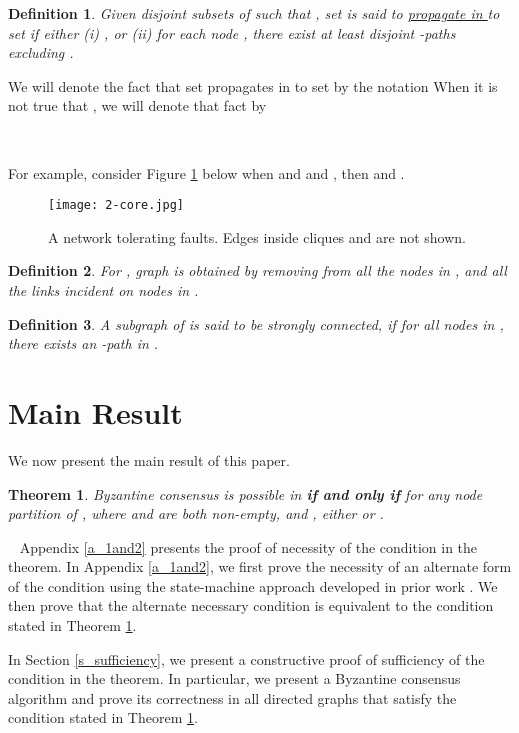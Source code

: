 \documentclass[letterpaper, 11pt]{article}
\newenvironment{proof}{\noindent {\bf Proof:}~}{\hspace*{\fill}}
\newtheorem{theorem}{Theorem}
\newtheorem{definition}{Definition}
\begin{document}
\begin{definition}
\label{def:propagate}
Given disjoint subsets  of  such that ,
set  is said to
\underline{propagate in } to set 
if either (i) , or (ii) for each node , there exist at least
 disjoint -paths excluding .
\end{definition}
We will denote the fact that set  propagates in  to set 
by the notation 
When it is not true that , we will denote that fact by 

~

For example, consider Figure \ref{f:2-core} below when  and  and , then  and .

\begin{figure}[hbtp!]
\centering
\texttt{[image: 2-core.jpg]}
\vspace*{-30pt}
\caption{A network tolerating  faults. Edges inside cliques  and  are not shown.}
\label{f:2-core}


\end{figure}

\begin{definition}
\label{def:G-F}
For , graph  is obtained by removing from 
all the nodes in , and all the links incident on nodes in .
\end{definition}

\begin{definition}
\label{def:strong}
A subgraph  of  is said to be {\em strongly connected}, if for all nodes  in , there exists an -path in . \end{definition}


\section{Main Result}
\label{nec_2}








We now present the main result of this paper.

\begin{theorem}
\label{t_nec_2}
Byzantine consensus is possible
in 
{\bf if and only if} for any node partition  of , where  and  are both non-empty, and , either  or .
\end{theorem}

\begin{proof}
Appendix \ref{a_1and2} presents the proof of necessity of the condition in the theorem. In Appendix \ref{a_1and2}, we first prove the necessity of an alternate form of the condition using the state-machine approach developed in prior work \cite{impossible_proof_lynch,dolev_82_BG,welch_book}. We then prove that the alternate necessary condition is equivalent to the condition stated in Theorem \ref{t_nec_2}.

In Section \ref{s_sufficiency}, we present a constructive proof of sufficiency of the condition in the theorem. In particular, we present a Byzantine consensus algorithm and prove its correctness in all directed graphs that satisfy the condition stated in Theorem \ref{t_nec_2}. 
\end{proof}
\end{document}
